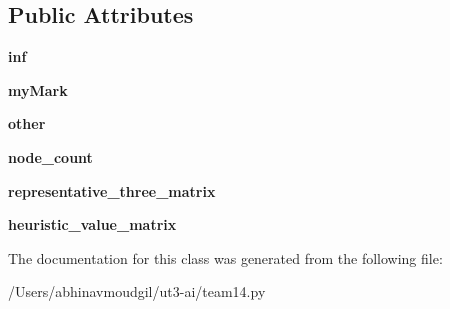\subsection*{Public Attributes}
\begin{DoxyCompactItemize}
\item 
{\bfseries inf}\hypertarget{classteam14_1_1_player14_a136abdac239c3735bfa83c339d792229}{}\label{classteam14_1_1_player14_a136abdac239c3735bfa83c339d792229}

\item 
{\bfseries my\+Mark}\hypertarget{classteam14_1_1_player14_a1d4908c0520c91ed8b5edb9c2daa7d5d}{}\label{classteam14_1_1_player14_a1d4908c0520c91ed8b5edb9c2daa7d5d}

\item 
{\bfseries other}\hypertarget{classteam14_1_1_player14_a90067b2bdb658928edcff42c7966b646}{}\label{classteam14_1_1_player14_a90067b2bdb658928edcff42c7966b646}

\item 
{\bfseries node\+\_\+count}\hypertarget{classteam14_1_1_player14_ae2891829e4cdeac5c6c5c9cf660aaa3b}{}\label{classteam14_1_1_player14_ae2891829e4cdeac5c6c5c9cf660aaa3b}

\item 
{\bfseries representative\+\_\+three\+\_\+matrix}\hypertarget{classteam14_1_1_player14_a531e2db0254a00ddee7daa3c9483aed5}{}\label{classteam14_1_1_player14_a531e2db0254a00ddee7daa3c9483aed5}

\item 
{\bfseries heuristic\+\_\+value\+\_\+matrix}\hypertarget{classteam14_1_1_player14_aa6c8b1b97337e945538b700bb3d544c9}{}\label{classteam14_1_1_player14_aa6c8b1b97337e945538b700bb3d544c9}

\end{DoxyCompactItemize}


The documentation for this class was generated from the following file\+:\begin{DoxyCompactItemize}
\item 
/\+Users/abhinavmoudgil/ut3-\/ai/team14.\+py\end{DoxyCompactItemize}
